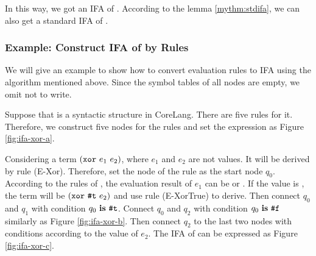 In this way, we got an IFA of . According to the lemma \ref{mythm:stdifa}, we can also get a standard IFA of .

\subsubsection{Example: Construct IFA of  by Rules}

We will give an example to show how to convert evaluation rules to IFA using the algorithm mentioned above. Since the symbol tables of all nodes are empty, we omit not to write.


Suppose that  is a syntactic structure in CoreLang. There are five rules for it. Therefore, we construct five nodes for the rules and set the expression as Figure \ref{fig:ifa-xor-a}.

Considering a term $(\mbox{\tt xor}~e_1~e_2)$, where $e_1$ and $e_2$ are not values. It will be derived by rule (E-Xor). Therefore, set the node of the rule as the start node $q_0$. According to the rules of , the evaluation result of $e_1$ can be  or . If the value is , the term will be $(\mbox{\tt xor}~\mbox{\tt \#t}~e_2)$ and use rule (E-XorTrue) to derive. Then connect $q_0$ and $q_1$ with condition $q_0~\mbox{\rm \bf is}~\mbox{\tt \#t}$. Connect $q_0$ and $q_2$ with condition $q_0~\mbox{\rm \bf is}~\mbox{\tt \#f}$ similarly as Figure \ref{fig:ifa-xor-b}. Then connect $q_2$ to the last two nodes with conditions according to the value of $e_2$. The IFA of  can be expressed as Figure \ref{fig:ifa-xor-c}.

